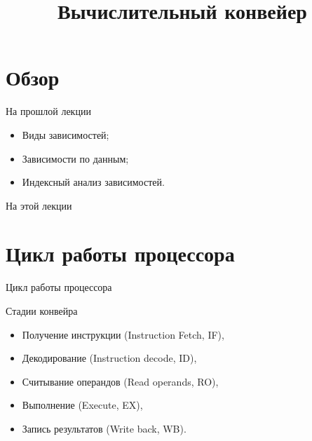 

\title{Вычислительный конвейер}



\begin{frame}
\titlepage
\end{frame}

\section*{Обзор}

\begin{frame}{На прошлой лекции}
\begin{itemize}
    \item Виды зависимостей;
    \item Зависимости по данным;
    \item Индексный анализ зависимостей.
\end{itemize}
\end{frame}

\begin{frame}{На этой лекции}
\tableofcontents
\end{frame}

\section{Цикл работы процессора}

\begin{frame}{Цикл работы процессора}
\centering
{}
\end{frame}

\begin{frame}{Стадии конвейра}
\begin{itemize}
    \item Получение инструкции (Instruction Fetch, IF),
    \item Декодирование (Instruction decode, ID),
    \item Считывание операндов (Read operands, RO),
    \item Выполнение (Execute, EX),
    \item Запись результатов (Write back, WB).
\end{itemize}
\end{frame}

